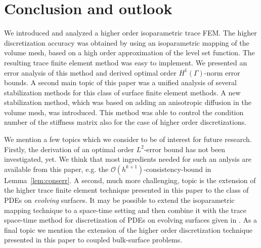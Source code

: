 \documentclass[final]{siamltex}
\begin{document}
\section{Conclusion and outlook} \label{sec:conclusion}
We introduced and analyzed a higher order iso\-para\-metric trace FEM. The higher discretization accuracy was obtained by using an isoparametric mapping of the volume mesh, based on a high order approximation of the level set function. The resulting trace finite element method was easy to implement. We presented an error analysis of this method and derived optimal order $H^1(\Gamma)$-norm error bounds. A second main topic of this paper was a unified analysis of several stabilization methods for this class of surface finite element methods. A new stabilization method, which was based on adding an anisotropic diffusion in the volume mesh, was introduced. This method was able to control the condition number of the stiffness matrix also for the case of higher order discretizations.
 
We mention a few topics which we consider to be of interest for future research. Firstly, the derivation of an optimal order $L^2$-error bound has not been investigated, yet. We think that most ingredients needed for such an anlysis are available from this paper, e.g. the $\mathcal{O}(h^{k+1})$-consistency-bound in Lemma~\ref{lem:conserr}. A second, much more challenging, topic is the extension of the higher trace finite element technique presented in this paper to the class of PDEs on \emph{evolving} surfaces. It may be possible to extend the isoparametric mapping technique to a space-time setting and then combine it with the trace space-time method for discretization of PDEs on evolving surfaces given in \cite{olshanskii14spacetime,olshanskii14spacetimeanalysis}. As a final topic we mention the extension of the higher order discretization technique presented in this paper to coupled bulk-surface problems. 
\appendix
\end{document}
